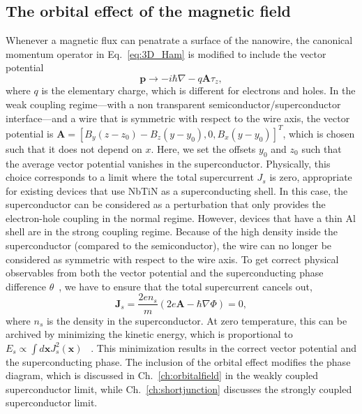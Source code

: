 \subsection{The orbital effect of the magnetic field}\label{sec:orbital_effect_of_magnetic_field}
Whenever a magnetic flux can penatrate a surface of the nanowire, the canonical momentum operator in Eq.~\eqref{eq:3D_Ham} is modified to include the vector potential
\begin{equation}
\bm{p} \rightarrow -i \hbar \nabla - q \bm{A} \tau_z,\label{eq:continuum_kinetic_with_orbital}
\end{equation}
where $q$ is the elementary charge, which is different for electrons and holes.
In the weak coupling regime---with a non transparent semiconductor/superconductor interface---and a wire that is symmetric with respect to the wire axis, the vector potential is $\mathbf{A}={\left[ B_y (z - z_0) - B_z (y - y_0), 0, B_x (y - y_0)\right]}^{T}$, which is chosen such that it does not depend on $x$.
Here, we set the offsets $y_0$ and $z_0$ such that the average vector potential vanishes in the superconductor.
Physically, this choice corresponds to a limit where the total supercurrent $J_s$ is zero, appropriate for existing devices that use NbTiN as a superconducting shell.
In this case, the superconductor can be considered as a perturbation that only provides the electron-hole coupling in the normal regime.
However, devices that have a thin Al shell are in the strong coupling regime.
Because of the high density inside the superconductor (compared to the semiconductor), the wire can no longer be considered as symmetric with respect to the wire axis.
To get correct physical observables from both the vector potential and the superconducting phase difference $\theta$~\cite{Wojcik2018}, we have to ensure that the total supercurrent cancels out,
\begin{equation}
\bm{J}_s = \frac{2e n_s}{m}\left(2e \bm{A} - \hbar \nabla \Phi \right)=0,
\end{equation}
where $n_s$ is the density in the superconductor.
At zero temperature, this can be archived by minimizing the kinetic energy, which is proportional to $E_s \propto \int d \bm{x} J_s^2(\bm{x})$ ~\cite{Winkler2019}.
This minimization results in the correct vector potential and the superconducting phase.
The inclusion of the orbital effect modifies the phase diagram, which is discussed in Ch.~\ref{ch:orbitalfield} in the weakly coupled superconductor limit, while Ch.~\ref{ch:shortjunction} discusses the strongly coupled superconductor limit.


